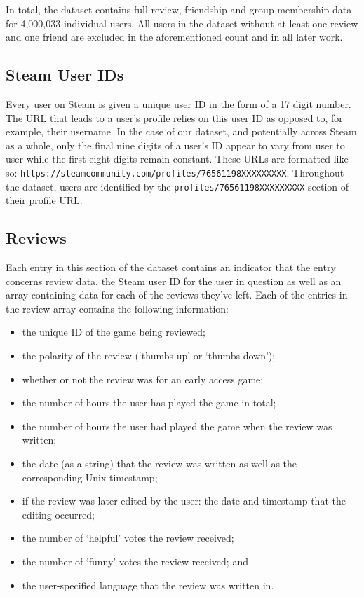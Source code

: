 In total, the dataset contains full review, friendship and group membership data for 4,000,033 individual users. All users in the dataset without at least one review and one friend are excluded in the aforementioned count and in all later work.

\subsection{Steam User IDs}

Every user on Steam is given a unique user ID in the form of a 17 digit number. The URL that leads to a user's profile relies on this user ID as opposed to, for example, their username. In the case of our dataset, and potentially across Steam as a whole, only the final nine digits of a user's ID appear to vary from user to user while the first eight digits remain constant. These URLs are formatted like so:  \texttt{https://steamcommunity.com/profiles/76561198XXXXXXXXX}. Throughout the dataset, users are identified by the \texttt{profiles/76561198XXXXXXXXX} section of their profile URL.

\subsection{Reviews}

Each entry in this section of the dataset contains an indicator that the entry concerns review data, the Steam user ID for the user in question as well as an array containing data for each of the reviews they've left. Each of the entries in the review array contains the following information:

\begin{itemize}
    \item the unique ID of the game being reviewed;
    \item the polarity of the review (`thumbs up' or `thumbs down');
    \item whether or not the review was for an early access game;
    \item the number of hours the user has played the game in total;
    \item the number of hours the user had played the game when the review was written;
    \item the date (as a string) that the review was written as well as the corresponding Unix timestamp;
    \item if the review was later edited by the user: the date and timestamp that the editing occurred;
    \item the number of `helpful' votes the review received;
    \item the number of `funny' votes the review received; and
    \item the user-specified language that the review was written in.
\end{itemize}

